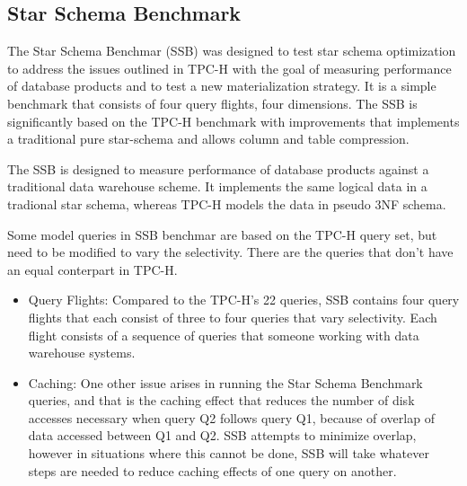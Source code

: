 \subsection{Star Schema Benchmark}
{\justify
The Star Schema Benchmar (SSB) \cite{SSB} was designed to test star schema optimization to address the issues outlined in TPC-H with the goal of measuring performance of database products and to test a new materialization strategy. It is a simple benchmark that consists of four query flights, four dimensions. The SSB is significantly based on the TPC-H benchmark with improvements that implements a traditional pure star-schema and allows column and table compression.
\par }
\vspace{0.5cm}
{\justify
The SSB is designed to measure performance of database products against a traditional data warehouse scheme. It implements the same logical data in a tradional star schema, whereas TPC-H models the data in pseudo 3NF schema.
\par }
\vspace{0.5cm}
{\justify
Some model queries in SSB benchmar are based on the TPC-H query set, but need to be modified to vary the selectivity. There are the queries that don't have an equal conterpart in TPC-H.
\begin{itemize}
\item Query Flights: Compared to the TPC-H's 22 queries, SSB contains four query flights that each consist of three to four queries that vary selectivity. Each flight consists of a sequence of queries that someone working with data warehouse systems.
\item Caching: One other issue arises in  running the Star Schema Benchmark queries, and that is the caching effect that reduces the number of disk accesses necessary when query Q2 follows query Q1, because of overlap of data accessed between Q1 and Q2. SSB attempts to minimize overlap, however in situations where this cannot be done, SSB will take whatever steps are needed to reduce caching effects of one query on another. 
\end{itemize}
\par }
